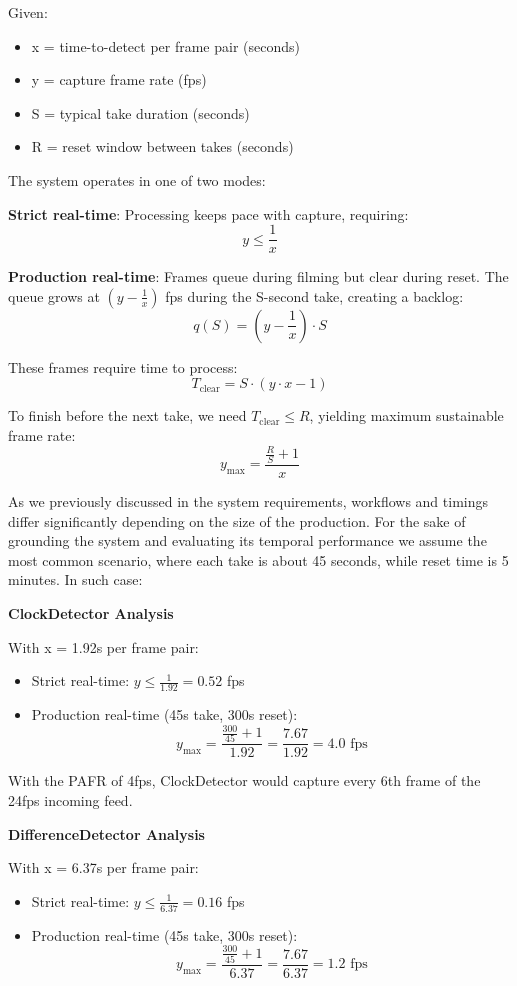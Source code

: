 Given:
\begin{itemize}
\item x = time-to-detect per frame pair (seconds)
\item y = capture frame rate (fps)
\item S = typical take duration (seconds)
\item R = reset window between takes (seconds)
\end{itemize}

The system operates in one of two modes:

\textbf{Strict real-time}: Processing keeps pace with capture, requiring:
$$y \leq \frac{1}{x}$$

\textbf{Production real-time}: Frames queue during filming but clear during reset. The queue grows at $(y - \frac{1}{x})$ fps during the S-second take, creating a backlog:
$$q(S) = \left(y - \frac{1}{x}\right) \cdot S$$

These frames require time to process:
$$T_{\text{clear}} = S \cdot (y \cdot x - 1)$$

To finish before the next take, we need $T_{\text{clear}} \leq R$, yielding maximum sustainable frame rate:
$$y_{\text{max}} = \frac{\frac{R}{S} + 1}{x}$$

As we previously discussed in the system requirements, workflows and timings differ significantly depending on the size of the production. For the sake of grounding the system and evaluating its temporal performance we assume the most common scenario, where each take is about 45 seconds, while reset time is 5 minutes. In such case:

\textbf{ClockDetector Analysis}

With x = 1.92s per frame pair:
\begin{itemize}
\item Strict real-time: $y \leq \frac{1}{1.92} = 0.52$ fps
\item Production real-time (45s take, 300s reset):
$$y_{\text{max}} = \frac{\frac{300}{45} + 1}{1.92} = \frac{7.67}{1.92} = 4.0 \text{ fps}$$
\end{itemize}

With the PAFR of 4fps, ClockDetector would capture every 6th frame of the 24fps incoming feed.

\textbf{DifferenceDetector Analysis}

With x = 6.37s per frame pair:
\begin{itemize}
\item Strict real-time: $y \leq \frac{1}{6.37} = 0.16$ fps
\item Production real-time (45s take, 300s reset):
$$y_{\text{max}} = \frac{\frac{300}{45} + 1}{6.37} = \frac{7.67}{6.37} = 1.2 \text{ fps}$$
\end{itemize}

